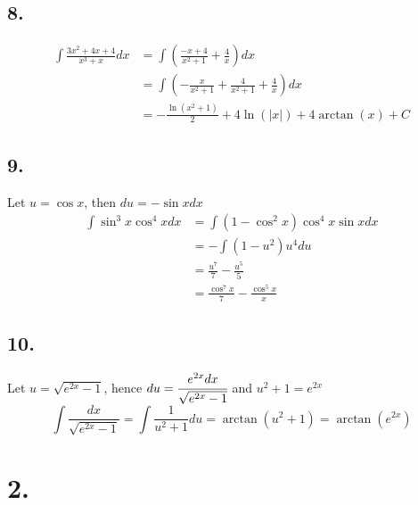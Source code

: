 \documentclass[11pt]{article}
\begin{document}
\subsection*{8.}
\begin{equation*}
    \begin{aligned}
        \int \frac{3x^2+4x+4}{x^3+x} dx &= \int \left(\frac{-x+4}{x^2+1} + \frac{4}{x} \right)dx \\
        &= \int \left(-\frac{x}{x^2+1} + \frac{4}{x^2+1} + \frac{4}{x}\right)dx \\
        &= - \frac{\ln (x^2+1)}{2}+ 4 \ln(|x|) + 4 \arctan(x) + C
    \end{aligned}
\end{equation*}
\subsection*{9.}
Let $u = \cos x$, then $du = - \sin x dx$
\begin{equation*}
    \begin{aligned}
        \int \sin^3x\cos^4x dx 
        &=  \int (1-\cos^2x)\cos^4x \sin x dx \\
        &= -\int (1-u^2)u^4 du \\
        &= \frac{u^7}{7} - \frac{u^5}{5} \\
        &= \frac{\cos^7x}{7}- \frac{\cos^5x}{x}
    \end{aligned}
\end{equation*}
\subsection*{10.}
Let $u = \sqrt{e^{2x}-1}$, hence $du = \cfrac{e^{2x}dx}{\sqrt{e^{2x}-1}}$ and $u^2+1 = e^{2x}$
\[
    \int \frac{dx}{\sqrt{e^{2x}-1}} = \int \frac{1}{u^2+1} du = \arctan(u^2+1) = \arctan(e^{2x})
\]
\pagebreak
\section*{2.}
\end{document}
